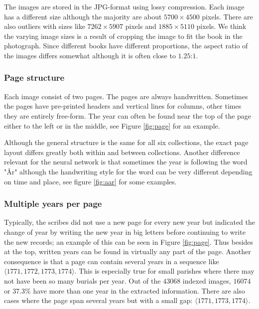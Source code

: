 The images are stored in the JPG-format using lossy compression. Each image has a different size although the majority are about $5700 \times 4500$ pixels. There are also outliers with sizes like $7262 \times 5907$ pixels and $1885 \times 5110$ pixels. We think the varying image sizes is a result of cropping the image to fit the book in the photograph.
Since different books have different proportions, the aspect ratio of the images differs somewhat although it is often close to $1.25$:$1$.

\subsubsection{Page structure}

Each image consist of two pages. The pages are always handwritten. Sometimes the pages have pre-printed headers and vertical lines for columns, other times they are entirely free-form.
The year can often be found near the top of the page either to the left or in the middle, see Figure \ref{fig:page} for an example.



Although the general structure is the same for all six collections, the exact page layout differs greatly both within and between collections. Another difference relevant for the neural network is that sometimes the year is following the word "\r{A}r" although the handwriting style for the word can be very different depending on time and place, see figure \ref{fig:aar} for some examples.


\subsubsection{Multiple years per page} \label{sssec:swe_multiyear}

Typically, the scribes did not use a new page for every new year but indicated the change of year by writing the new year in big letters before continuing to write the new records; an example of this can be seen in Figure \ref{fig:page}.
Thus besides at the top, written years can be found in virtually any part of the page. Another consequence is that a page can contain several years in a sequence like $\langle 1771, 1772, 1773, 1774 \rangle$. This is especially true for small parishes where there may not have been so many burials per year. Out of the $43068$ indexed images, $16074$ or $37.3\%$ have more than one year in the extracted information. There are also cases where the page span several years but with a small gap: $\langle 1771, 1773, 1774 \rangle$.

